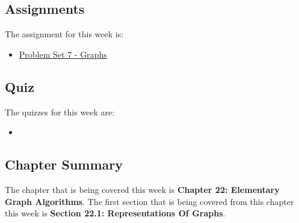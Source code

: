 \subsection{Assignments}

The assignment for this week is:

\begin{itemize}
    \item \href{https://github.com/QuantumCompiler/CU/tree/main/CSPB%203104%20-%20Algorithms/CSPB%203104%20-%20Assignments/CSPB%203104%20-%20Problem%20Sets/CSPB%203104%20-%20Problem%20Set%207%20-%20Graphs}{Problem Set 7 - Graphs}
\end{itemize}

\subsection{Quiz}

The quizzes for this week are:

\begin{itemize}
    \item {}
\end{itemize}

\subsection{Chapter Summary}

The chapter that is being covered this week is \textbf{Chapter 22: Elementary Graph Algorithms}. The first section that is being covered from this chapter this week is \textbf{Section 22.1: Representations Of Graphs}.

